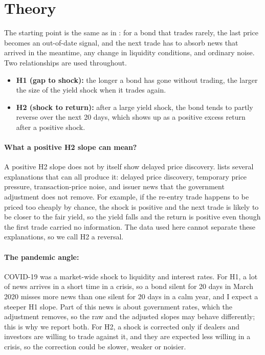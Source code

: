\documentclass[a4paper,11pt]{article}
\begin{document}
\section{Theory}
The starting point is the same as in \cite{kumar2026delayed}: for a bond that trades rarely, the last price becomes an out-of-date signal, and the next trade has to absorb news that arrived in the meantime, any change in liquidity conditions, and ordinary noise. Two relationships are used throughout.
\begin{itemize}
	\item \textbf{H1 (gap to shock):} the longer a bond has gone without trading, the larger the size of the yield shock when it trades again.
	\item \textbf{H2 (shock to return):} after a large yield shock, the bond tends to partly reverse over the next 20 days, which shows up as a positive excess return after a positive shock.
\end{itemize}

\paragraph{What a positive H2 slope can mean?} A positive H2 slope does not by itself show delayed price discovery. \cite{kumar2026delayed} lists several explanations that can all produce it: delayed price discovery, temporary price pressure, transaction-price noise, and issuer news that the government adjustment does not remove. For example, if the re-entry trade happens to be priced too cheaply by chance, the shock is positive and the next trade is likely to be closer to the fair yield, so the yield falls and the return is positive even though the first trade carried no information. The data used here cannot separate these explanations, so we call H2 a reversal.

\paragraph{The pandemic angle:} COVID-19 was a market-wide shock to liquidity and interest rates. For H1, a lot of news arrives in a short time in a crisis, so a bond silent for 20 days in March 2020 misses more news than one silent for 20 days in a calm year, and I expect a steeper H1 slope. Part of this news is about government rates, which the adjustment removes, so the raw and the adjusted slopes may behave differently; this is why we report both. For H2, a shock is corrected only if dealers and investors are willing to trade against it, and they are expected less willing in a crisis, so the correction could be slower, weaker or noisier.
\end{document}

